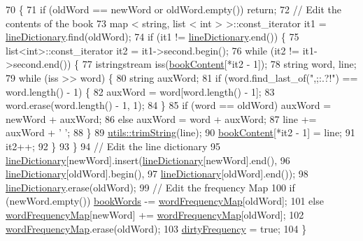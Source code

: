 \begin{DoxyCode}
70                                                       \{
71     \textcolor{keywordflow}{if} (oldWord == newWord or oldWord.empty()) \textcolor{keywordflow}{return};
72     \textcolor{comment}{// Edit the contents of the book}
73     map < string, list < int > >::const\_iterator it1 = \hyperlink{class_book_a7da5c2f5239458c2ab88576cac8d0a10}{lineDictionary}.find(oldWord);
74     \textcolor{keywordflow}{if} (it1 != \hyperlink{class_book_a7da5c2f5239458c2ab88576cac8d0a10}{lineDictionary}.end()) \{
75         list<int>::const\_iterator it2 = it1->second.begin();
76         \textcolor{keywordflow}{while} (it2 != it1->second.end()) \{
77             istringstream iss(\hyperlink{class_book_a62ca3f4431b699fa41384c8bab7ef4fa}{bookContent}[*it2 - 1]);
78             \textcolor{keywordtype}{string} word, line;
79             \textcolor{keywordflow}{while} (iss >> word) \{
80                 \textcolor{keywordtype}{string} auxWord;
81                 \textcolor{keywordflow}{if} (word.find\_last\_of(\textcolor{stringliteral}{",;:.?!"}) == word.length() - 1) \{
82                     auxWord = word[word.length() - 1];
83                     word.erase(word.length() - 1, 1);
84                 \}
85                 \textcolor{keywordflow}{if} (word == oldWord) auxWord = newWord + auxWord;
86                 \textcolor{keywordflow}{else} auxWord = word + auxWord;
87                 line += auxWord + \textcolor{charliteral}{' '};
88             \}
89             \hyperlink{namespaceutils_a9f184d101ac739ab058355ab5413ca9a}{utils::trimString}(line);
90             \hyperlink{class_book_a62ca3f4431b699fa41384c8bab7ef4fa}{bookContent}[*it2 - 1] = line;
91             it2++;
92         \}
93     \}
94     \textcolor{comment}{// Edit the line dictionary}
95     \hyperlink{class_book_a7da5c2f5239458c2ab88576cac8d0a10}{lineDictionary}[newWord].insert(\hyperlink{class_book_a7da5c2f5239458c2ab88576cac8d0a10}{lineDictionary}[newWord].end(),
96                                    \hyperlink{class_book_a7da5c2f5239458c2ab88576cac8d0a10}{lineDictionary}[oldWord].begin(),
97                                    \hyperlink{class_book_a7da5c2f5239458c2ab88576cac8d0a10}{lineDictionary}[oldWord].end());
98     \hyperlink{class_book_a7da5c2f5239458c2ab88576cac8d0a10}{lineDictionary}.erase(oldWord);
99     \textcolor{comment}{// Edit the frequency Map}
100     \textcolor{keywordflow}{if} (newWord.empty()) \hyperlink{class_book_a36f1e0b30a0ad17606976556cab45a23}{bookWords} -= \hyperlink{class_book_a18b73c8d2b492cad5b7b0c187b08dfc0}{wordFrequencyMap}[oldWord];
101     \textcolor{keywordflow}{else} \hyperlink{class_book_a18b73c8d2b492cad5b7b0c187b08dfc0}{wordFrequencyMap}[newWord] += \hyperlink{class_book_a18b73c8d2b492cad5b7b0c187b08dfc0}{wordFrequencyMap}[oldWord];
102     \hyperlink{class_book_a18b73c8d2b492cad5b7b0c187b08dfc0}{wordFrequencyMap}.erase(oldWord);
103     \hyperlink{class_book_ad1df1050750f0605efdfab51b86c0765}{dirtyFrequency} = \textcolor{keyword}{true};
104 \}
\end{DoxyCode}
